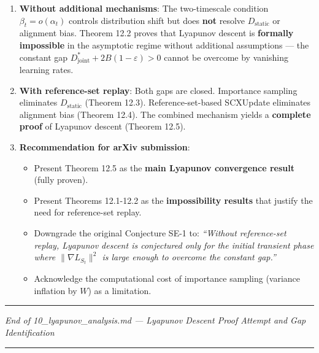\documentclass[
  12pt,
]{article}
\providecommand{\tightlist}{%
  \setlength{\itemsep}{0pt}\setlength{\parskip}{0pt}}
\begin{document}
\begin{enumerate}
\def\labelenumi{\arabic{enumi}.}
\item
  \textbf{Without additional mechanisms}: The two-timescale condition
  \(\beta_t = o(\alpha_t)\) controls distribution shift but does
  \textbf{not} resolve \(D_{\text{static}}\) or alignment bias. Theorem
  12.2 proves that Lyapunov descent is \textbf{formally impossible} in
  the asymptotic regime without additional assumptions --- the constant
  gap \(D_{\text{joint}}^* + 2B(1-\varepsilon) > 0\) cannot be overcome
  by vanishing learning rates.
\item
  \textbf{With reference-set replay}: Both gaps are closed. Importance
  sampling eliminates \(D_{\text{static}}\) (Theorem 12.3).
  Reference-set-based SCXUpdate eliminates alignment bias (Theorem
  12.4). The combined mechanism yields a \textbf{complete proof} of
  Lyapunov descent (Theorem 12.5).
\item
  \textbf{Recommendation for arXiv submission}:

  \begin{itemize}
  \tightlist
  \item
    Present Theorem 12.5 as the \textbf{main Lyapunov convergence
    result} (fully proven).
  \item
    Present Theorems 12.1-12.2 as the \textbf{impossibility results}
    that justify the need for reference-set replay.
  \item
    Downgrade the original Conjecture SE-1 to: \emph{``Without
    reference-set replay, Lyapunov descent is conjectured only for the
    initial transient phase where \(\|\nabla L_{S_t}\|^2\) is large
    enough to overcome the constant gap.''}
  \item
    Acknowledge the computational cost of importance sampling (variance
    inflation by \(W\)) as a limitation.
  \end{itemize}
\end{enumerate}

\begin{center}\rule{0.5\linewidth}{0.5pt}\end{center}

\emph{End of 10\_lyapunov\_analysis.md --- Lyapunov Descent Proof
Attempt and Gap Identification}

\begin{center}\rule{0.5\linewidth}{0.5pt}\end{center}
\end{document}
